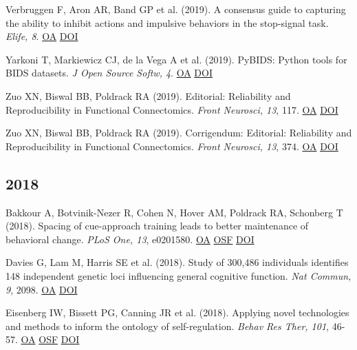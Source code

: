 \documentclass[10pt, letterpaper]{article}
\begin{document}
Verbruggen F, Aron AR, Band GP et al. (2019). A consensus guide to capturing the ability to inhibit actions and impulsive behaviors in the stop-signal task. \textit{Elife, 8}. \href{https://www.ncbi.nlm.nih.gov/pmc/articles/PMC6533084}{OA} \href{http://dx.doi.org/10.7554/elife.46323}{DOI} \vspace{2mm}

Yarkoni T, Markiewicz CJ, de la Vega A et al. (2019). PyBIDS: Python tools for BIDS datasets. \textit{J Open Source Softw, 4}. \href{https://www.ncbi.nlm.nih.gov/pmc/articles/PMC7409983}{OA} \href{http://dx.doi.org/10.21105/joss.01294}{DOI} \vspace{2mm}

Zuo XN, Biswal BB, Poldrack RA (2019). Editorial: Reliability and Reproducibility in Functional Connectomics. \textit{Front Neurosci, 13}, 117. \href{https://www.ncbi.nlm.nih.gov/pmc/articles/PMC6391345}{OA} \href{http://dx.doi.org/10.3389/fnins.2019.00117}{DOI} \vspace{2mm}

Zuo XN, Biswal BB, Poldrack RA (2019). Corrigendum: Editorial: Reliability and Reproducibility in Functional Connectomics. \textit{Front Neurosci, 13}, 374. \href{https://www.ncbi.nlm.nih.gov/pmc/articles/PMC6477511}{OA} \href{http://dx.doi.org/10.3389/fnins.2019.00374}{DOI} \vspace{2mm}

\subsection*{2018}Bakkour A, Botvinik-Nezer R, Cohen N, Hover AM, Poldrack RA, Schonberg T (2018). Spacing of cue-approach training leads to better maintenance of behavioral change. \textit{PLoS One, 13}, e0201580. \href{https://www.ncbi.nlm.nih.gov/pmc/articles/PMC6066248}{OA} \href{https://osf.io/fdvrk/}{OSF} \href{http://dx.doi.org/10.1371/journal.pone.0201580}{DOI} \vspace{2mm}

Davies G, Lam M, Harris SE et al. (2018). Study of 300,486 individuals identifies 148 independent genetic loci influencing general cognitive function. \textit{Nat Commun, 9}, 2098. \href{https://www.ncbi.nlm.nih.gov/pmc/articles/PMC5974083}{OA} \href{http://dx.doi.org/10.1038/s41467-018-04362-x}{DOI} \vspace{2mm}

Eisenberg IW, Bissett PG, Canning JR et al. (2018). Applying novel technologies and methods to inform the ontology of self-regulation. \textit{Behav Res Ther, 101}, 46-57. \href{https://www.ncbi.nlm.nih.gov/pmc/articles/PMC5801197}{OA} \href{https://osf.io/amxpv/}{OSF} \href{http://dx.doi.org/10.1016/j.brat.2017.09.014}{DOI} \vspace{2mm}
\end{document}
